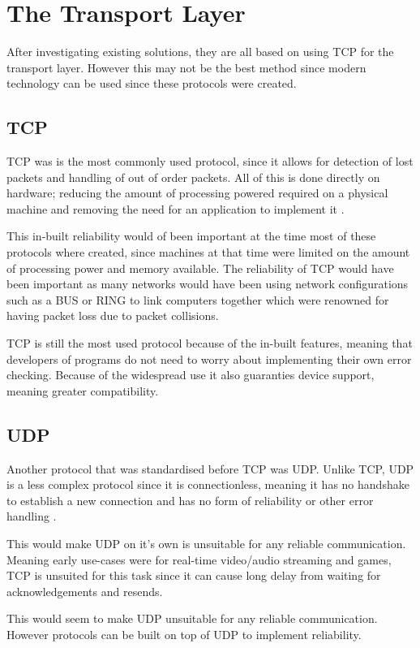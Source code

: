 \section{The Transport Layer}
After investigating existing solutions, they are all based on using TCP for the transport layer. However this may not be the best method since modern technology can be used since these protocols were created.

\subsection*{TCP}
TCP was is the most commonly used protocol, since it allows for detection of lost packets and handling of out of order packets. All of this is done directly on hardware; reducing the amount of processing powered required on a physical machine and removing the need for an application to implement it \parencite{tcp-rfc793}.

This in-built reliability would of been important at the time most of these protocols where created, since machines at that time were limited on the amount of processing power and memory available. The reliability of TCP would have been important as many networks would have been using network configurations such as a BUS or RING to link computers together which were renowned for having packet loss due to packet collisions.

TCP is still the most used protocol because of the in-built features, meaning that developers of programs do not need to worry about implementing their own error checking. Because of the widespread use it also guaranties device support, meaning greater compatibility.

\subsection*{UDP}
Another protocol that was standardised before TCP was UDP. Unlike TCP, UDP is a less complex protocol since it is connectionless, meaning it has no handshake to establish a new connection and has no form of reliability or other error handling \parencite{udp-rfc768}.

This would make UDP on it's own is unsuitable for any reliable communication. Meaning early use-cases were for real-time video/audio streaming and games, TCP is unsuited for this task since it can cause long delay from waiting for acknowledgements and resends.

This would seem to make UDP unsuitable for any reliable communication. However protocols can be built on top of UDP to implement reliability.

